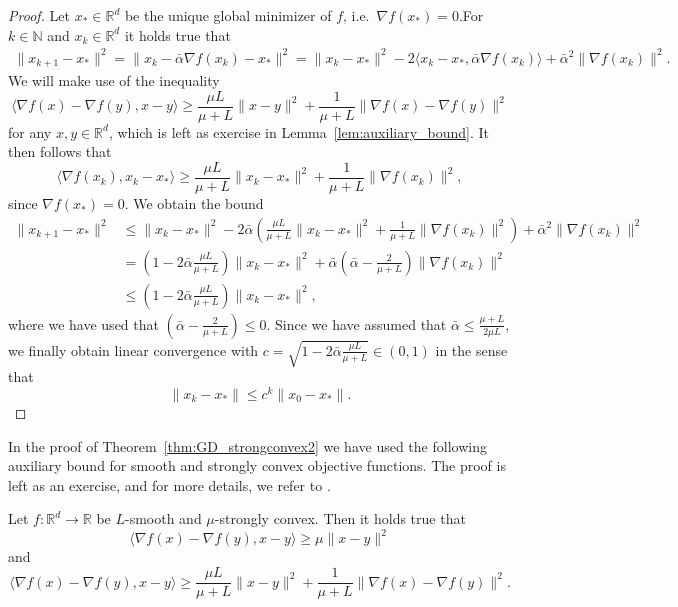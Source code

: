 \documentclass[12pt,openany]{book}
\theoremstyle{definition}
\theoremstyle{definition}
\newcommand{\N}{\mathbb{N}}
\newcommand{\R}{\mathbb{R}}
\begin{document}
\begin{proof}
Let $x_\ast\in\R^d$ be the unique global minimizer of $f$, i.e.~$\nabla f(x_\ast) = 0$.For $k\in\N$ and $x_k\in\R^d$ it holds true that
\begin{align*}
\|x_{k+1}-x_\ast\|^2 = \|x_{k}-\bar \alpha \nabla f(x_k)-x_\ast\|^2 = \|x_k-x_\ast\|^2 - 2\langle x_k-x_\ast,\bar\alpha \nabla f(x_k)\rangle + \bar\alpha^2\|\nabla f(x_k)\|^2.
\end{align*}  
We will make use of the inequality
\[\langle \nabla f(x)-\nabla f(y),x-y\rangle \ge \frac{\mu L}{\mu+L} \|x-y\|^2 + \frac{1}{\mu+L}\|\nabla f(x)-\nabla f(y)\|^2\]
for any $x,y\in\R^d$, which is left as exercise in Lemma~\ref{lem:auxiliary_bound}.  It then follows that
\[\langle \nabla f(x_k), x_k-x_\ast\rangle \ge \frac{\mu L}{\mu+L} \|x_k-x_\ast\|^2 + \frac{1}{\mu+L} \|\nabla f(x_k)\|^2, \]
since $\nabla f(x_\ast) = 0$. We obtain the bound
\begin{align*}
\|x_{k+1}-x_\ast \|^2 &\le \|x_k-x_\ast\|^2 - 2\bar\alpha (\frac{\mu L}{\mu+L} \|x_k - x_\ast\|^2 + \frac{1}{\mu+L} \|\nabla f(x_k)\|^2) + \bar\alpha^2 \|\nabla f(x_k) \|^2\\
&=(1-2\bar\alpha \frac{\mu L}{\mu+L})\|x_k-x_\ast\|^2 + \bar\alpha (\bar\alpha-\frac{2}{\mu+L})\|\nabla f(x_k)\|^2\\
&\le (1-2\bar\alpha \frac{\mu L}{\mu+L})\|x_k-x_\ast\|^2,
\end{align*}
where we have used that $(\bar\alpha-\frac{2}{\mu+L})\le 0$.  Since we have assumed that $\bar\alpha \le \frac{\mu+L}{2\mu L}$, we finally obtain linear convergence with $c=\sqrt{1-2\bar\alpha \frac{\mu L}{\mu+L}}\in(0,1)$ in the sense that
\[\|x_k-x_\ast\| \le c^k \|x_0-x_\ast\|. \]
\end{proof}
In the proof of Theorem~\ref{thm:GD_strongconvex2} we have used the following auxiliary bound for smooth and strongly convex objective functions. The proof is left as an exercise, and for more details, we refer to \cite[Theorem~2.1.12]{N2018}.
\begin{lemma}\label{lem:auxiliary_bound}
Let $f:\R^d\to\R$ be $L$-smooth and $\mu$-strongly convex. Then it holds true that
\[\langle \nabla f(x)-\nabla f(y), x-y\rangle \ge \mu\|x-y\|^2 \]
and 
\[\langle \nabla f(x)-\nabla f(y),x-y\rangle \ge \frac{\mu L}{\mu+L} \|x-y\|^2 + \frac{1}{\mu+L} \|\nabla f(x)- \nabla f(y)\|^2. \]
\end{lemma}
\end{document}
